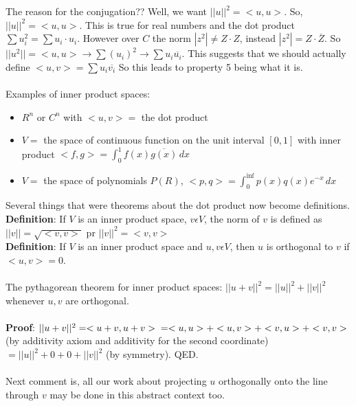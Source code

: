 \documentclass{article}
\begin{document}
The reason for the conjugation?? Well, we want $||u||^2 = <u,u>$. So, $||u||^2 = <u,u>$. This is true for real numbers and the dot product $\sum{u_i^2} = \sum{u_i \cdot u_i}$. However over $C$ the norm $|z^2| \neq Z\cdot Z$, instead $|z^2| = Z \cdot \overline{Z}$. So $||u^2|| = <u,u> \rightarrow \sum{(u_i)^2} \rightarrow \sum{u_i \overline{u_i}}$.
This suggests that we should actually define $<u,v> = \sum{u_i \overline{v_i}}$
So this leads to property 5 being what it is. \\\\
Examples of inner product spaces:
\begin{itemize}
    \item $R^n$ or $C^n$ with $<u,v> =$ the dot product 
    \item $V = $ the space of continuous function on the unit interval $[0,1]$ with inner product $<f,g> = \int_{0}^{1} f(x) \overline{g(x)} \,dx$
    \item $V =$ the space of polynomials $P(R)$, $<p,q> =\int_{0}^{\inf} p(x)q(x) e^{-x} \,dx $ 
\end{itemize}
Several things that were theorems about the dot product now become definitions.\\ 
\textbf{Definition}: If $V$ is an inner product space, $v \epsilon V$, the norm of $v$ is defined as $||v|| = \sqrt{<v,v>}$ pr $||v||^2 = <v,v>$ \\ 
\textbf{Definition}: If $V$ is an inner product space and $u,v \epsilon V$, then $u$ is orthogonal to $v$ if $<u,v> = 0$. \\\\
The pythagorean theorem for inner product spaces: $||u+v||^2 = ||u||^2 + ||v||^2$ whenever $u,v$ are orthogonal. \\\\
\textbf{Proof}: $||u+v||^2 = <u+v, u+v> \\ = <u,u> + <u,v> + <v,u> + <v,v>$ (by additivity axiom and additivity for the second coordinate) \\
$=||u||^2 + 0 + 0 + ||v||^2$ (by symmetry). QED. \\\\
Next comment is, all our work about projecting $u$ orthogonally onto the line through $v$ may be done in this abstract context too. 
\end{document}
